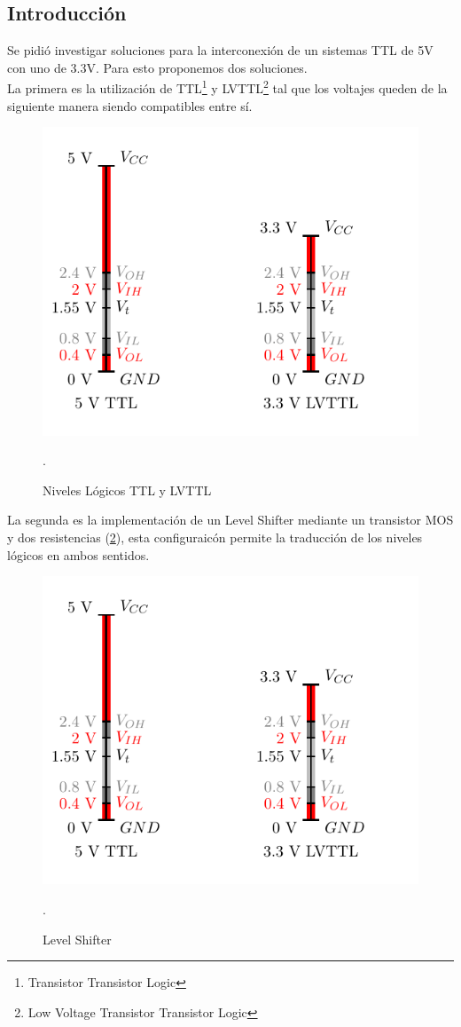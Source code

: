 \subsection{Introducción}
Se pidió investigar soluciones para la interconexión de un sistemas TTL de 5V con uno de 3.3V. Para esto proponemos dos soluciones.\\
La primera es la utilización de TTL\footnote{Transistor Transistor Logic} y LVTTL\footnote{Low Voltage Transistor Transistor Logic} tal que los voltajes queden de la siguiente manera siendo compatibles entre sí.\\
\begin{figure}[H]
  \centering
  \includegraphics[width=.6\textwidth, page = 1]{ImagenesEjercicio4/Draw.pdf}
  \caption{Niveles Lógicos TTL y LVTTL}.
  \label{fig:ttlLvl}
\end{figure}
La segunda es la implementación de un Level Shifter mediante un transistor MOS y dos resistencias (\ref{fig:LVSH}), esta configuraicón permite la traducción de los niveles lógicos en ambos sentidos.
\begin{figure}[H]
  \centering
  \includegraphics[width=.6\textwidth, page = 2]{ImagenesEjercicio4/Draw.pdf}
  \caption{Level Shifter}.
  \label{fig:LVSH}
\end{figure}